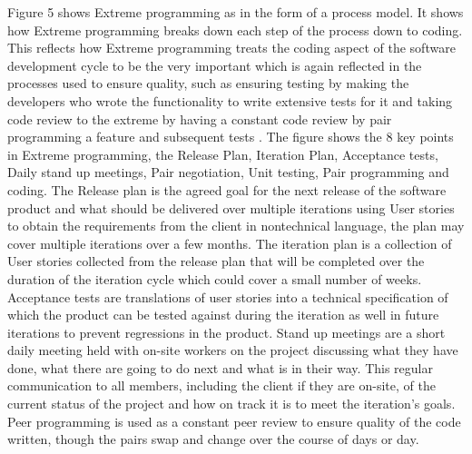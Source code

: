 \documentclass{style/CRPITStyle}
\renewcommand{\cite}{\citep}
\begin{document}
Figure 5 shows Extreme programming as in the form of a process model.
It shows how Extreme programming breaks down each step of the process down to
coding. This reflects how Extreme programming treats the coding aspect of
the software development cycle to be the very important which is again reflected 
in the processes used to ensure quality, such as ensuring testing by making the
developers who wrote the functionality to write extensive tests for it and
taking code review to the extreme by having a constant code review by pair
programming a feature and subsequent tests \cite{beck:2000:xp}.
The figure shows the 8 key points in Extreme programming, the Release Plan,
Iteration Plan, Acceptance tests, Daily stand up meetings, Pair negotiation,
Unit testing, Pair programming and coding.  
The Release plan is the agreed goal for the next release of the software 
product and what should be delivered over multiple iterations using User 
stories to obtain the requirements from the client in nontechnical language, the
plan may cover multiple iterations over a few months.
The iteration plan is a collection of User stories collected from the release
plan that will be completed over the duration of the iteration cycle which could
cover a small number of weeks.
Acceptance tests are translations of user stories into a technical specification
of which the product can be tested against during the iteration as well in
future iterations to prevent regressions in the product.
Stand up meetings are a short daily meeting held with on-site workers on the project
discussing what they have done, what there are going to do next and what is in
their way. This regular communication to all members, including the client if 
they are on-site, of the current status of the project and how on track it is to
meet the iteration's goals. Peer programming is used as a constant peer review
to ensure quality of the code written, though the pairs swap and change over the
course of days or day.

\end{document}
